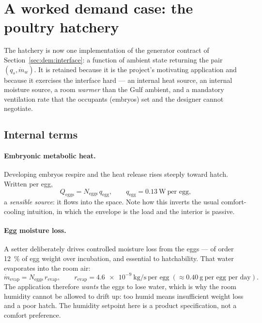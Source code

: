\documentclass[11pt]{article}
\newcommand{\mdw}{\ensuremath{\dot m_{w}}}
\newcommand{\qs}{\ensuremath{q_{s}}}
\begin{document}
\section{A worked demand case: the poultry hatchery}
\label{sec:dem:hatch}

The hatchery is now one implementation of the generator contract of
Section~\ref{sec:dem:interface}: a function of ambient state returning the pair
$(\qs,\mdw)$. It is retained because it is the project's motivating application
and because it exercises the interface hard --- an internal heat source, an
internal moisture source, a room \emph{warmer} than the Gulf ambient, and a
mandatory ventilation rate that the occupants (embryos) set and the designer
cannot negotiate.

\subsection{Internal terms}
\label{sec:dem:internal}

\paragraph{Embryonic metabolic heat.} Developing embryos respire and the heat
release rises steeply toward hatch. Written per egg,
\begin{equation}
Q_{\mathrm{eggs}}=N_{\mathrm{eggs}}\,q_{\mathrm{egg}},
\qquad q_{\mathrm{egg}}=\SI{0.13}{\watt}\ \text{per egg},
\label{eq:dem:Qeggs}
\end{equation}
a \emph{sensible source}: it flows into the space. Note how this inverts the
usual comfort-cooling intuition, in which the envelope is the load and the
interior is passive.

\paragraph{Egg moisture loss.} A setter deliberately drives controlled moisture
loss from the eggs --- of order \SI{12}{\percent} of egg weight over incubation,
and essential to hatchability. That water evaporates into the room air:
\begin{equation}
\dot m_{\mathrm{evap}}=N_{\mathrm{eggs}}\,r_{\mathrm{evap}},
\qquad r_{\mathrm{evap}}=\SI{4.6e-9}{\kilogram\per\second}\ \text{per egg}
\;(\approx\SI{0.40}{\gram}\ \text{per egg per day}).
\label{eq:dem:mevap}
\end{equation}
The application therefore \emph{wants} the eggs to lose water, which is why the
room humidity cannot be allowed to drift up: too humid means insufficient weight
loss and a poor hatch. The humidity setpoint here is a product specification, not
a comfort preference.
\end{document}
